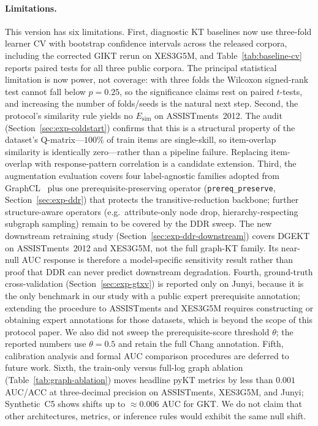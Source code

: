 \documentclass[runningheads]{llncs}
\newcommand{\Esim}{\ensuremath{E_{\text{sim}}}}
\newcommand{\DDR}{\textsc{DDR}}
\begin{document}
\paragraph{Limitations.}
This version has six limitations.
First, diagnostic KT baselines now use three-fold learner CV with bootstrap
confidence intervals across the released corpora, including the corrected GIKT rerun
on XES3G5M, and Table~\ref{tab:baseline-cv} reports paired tests for all three
public corpora. The principal statistical limitation is now power, not coverage:
with three folds the Wilcoxon signed-rank test cannot fall below $p{=}0.25$, so
the significance claims rest on paired $t$-tests, and increasing the number of
folds/seeds is the natural next step.
Second, the protocol's similarity rule yields no $\Esim$ on
ASSISTments~2012. The audit
(Section~\ref{sec:exp-coldstart}) confirms that this is a structural
property of the dataset's Q-matrix---$100\%$ of train items are
single-skill, so item-overlap similarity is identically zero---rather
than a pipeline failure. Replacing item-overlap with response-pattern
correlation is a candidate extension.
Third, the augmentation evaluation covers four label-agnostic
families adopted from GraphCL~\cite{you2020graphcl} plus one
prerequisite-preserving operator (\texttt{prereq\_preserve},
Section~\ref{sec:exp-ddr}) that protects the transitive-reduction
backbone; further structure-aware operators (e.g.\ attribute-only
node drop, hierarchy-respecting subgraph sampling) remain to be
covered by the \DDR{} sweep. The new downstream retraining study
(Section~\ref{sec:exp-ddr-downstream}) covers DGEKT on ASSISTments~2012
and XES3G5M, not the full graph-KT family. Its near-null AUC response is
therefore a model-specific sensitivity result rather than proof that
\DDR{} can never predict downstream degradation.
Fourth, ground-truth cross-validation
(Section~\ref{sec:exp-gtxv}) is reported only on Junyi, because it is
the only benchmark in our study with a public expert prerequisite
annotation; extending the procedure to ASSISTments and XES3G5M
requires constructing or obtaining expert annotations for those
datasets, which is beyond the scope of this protocol paper. We also
did not sweep the prerequisite-score threshold $\theta$; the reported
numbers use $\theta=0.5$ and retain the full Chang annotation.
Fifth, calibration analysis and formal AUC comparison procedures are
deferred to future work.
Sixth, the train-only versus full-log graph ablation
(Table~\ref{tab:graph-ablation}) moves headline pyKT metrics by less than
$0.001$ AUC/ACC at three-decimal precision on ASSISTments, XES3G5M, and
Junyi; Synthetic~C5 shows shifts up to $\approx 0.006$ AUC for GKT. We do not
claim that other architectures, metrics, or inference rules would exhibit the
same null shift.
\end{document}
